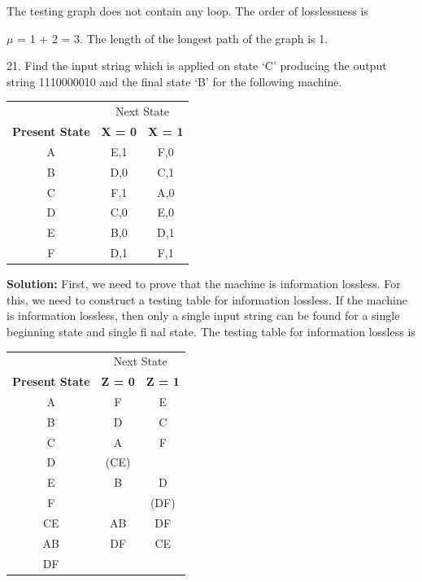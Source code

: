 \documentclass{beamer}
\begin{document}
\begin{frame}
	 The testing graph does not contain any loop. The order of losslessness is
	
	$\mu$ = 1 + 2 = 3. The length of the longest path of the graph is 1. 
	
	21. Find the input string which is applied on state ‘C’ producing the output string 1110000010 and the ﬁnal state ‘B’ for the following machine.
	
\end{frame}	

\begin{frame}
	 \begin{center}
		\begin{tabular}{ccc}
			\hline
			&\multicolumn{2}{c}{Next State}\\
			\cline{2-3}
			\textbf{Present State} & \textbf{X = 0} & \textbf{X = 1}\\
			\hline
			A & E,1 & F,0\\
			B & D,0 & C,1\\
			C & F,1 & A,0\\
			D & C,0 & E,0\\
			E & B,0 & D,1\\
			F & D,1 & F,1\\
			\hline
		\end{tabular}
	\end{center}
\end{frame}	
\begin{frame}
	\textbf{Solution:} First, we need to prove that the machine is information lossless. For this, we need to construct a testing table for information lossless. If the machine is information lossless, then only a single input string can be found for a single beginning state and single ﬁ nal state. The testing table for information lossless is
\end{frame}
\begin{frame}
	\begin{center}
		\begin{tabular}{ccc}
			\hline
			& \multicolumn{2}{c}{Next State}\\
			\cline{2-3}
			\textbf{Present State} & \textbf{Z = 0} & \textbf{Z = 1}\\
			\hline
			A & F & E\\
			B & D & C\\
			C & A & F\\
			D & (CE)\\
			E & B & D\\
			F & & (DF)\\
			\hline
			CE & AB & DF\\
			AB & DF & CE\\
			DF\\
			\hline
			
		\end{tabular}
	\end{center}
\end{frame}
\end{document}

